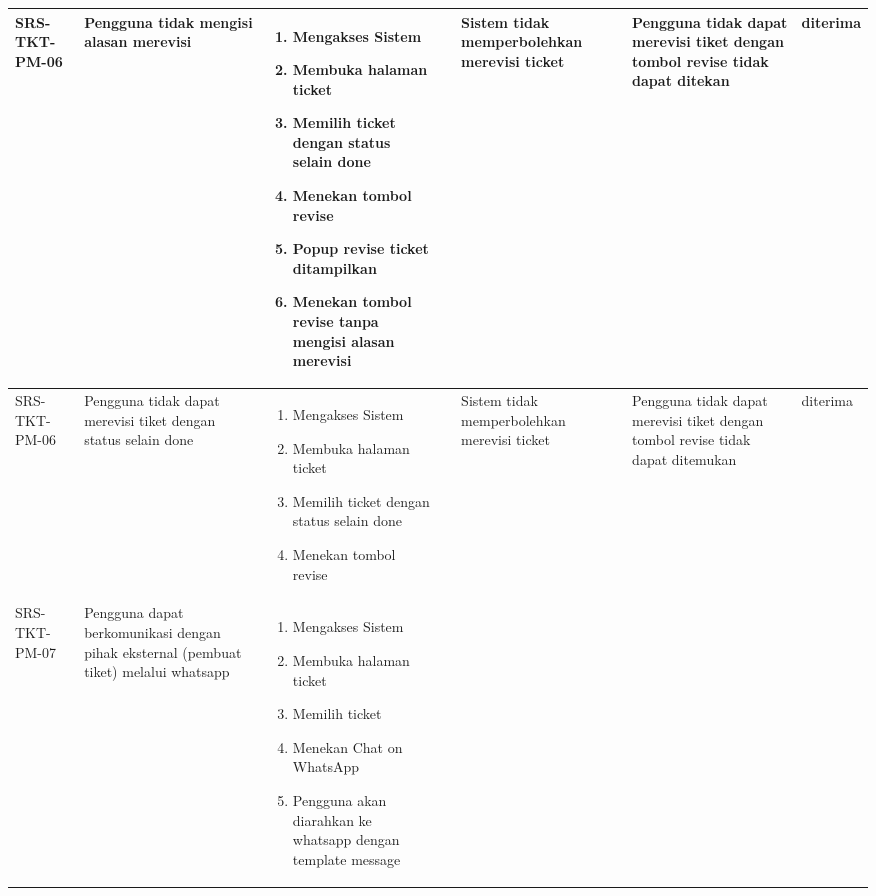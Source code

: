 \documentclass[12pt]{article}
\begin{document}
\begin{enumerate}[label=\textbf{5.\arabic*.}]
\begin{enumerate}[label=\textbf{5.2.\arabic*.}]
\begin{landscape}
\begin{longtable}{ |l|p{}|p{}|p{}|p{}|p{}|l| }
                \hline
                SRS-TKT-PM-06 & Pengguna tidak mengisi alasan merevisi & 
                \begin{enumerate}[label=\arabic*.] 
                    \item Mengakses Sistem
                    \item Membuka halaman ticket
                    \item Memilih ticket dengan status selain done
                    \item Menekan tombol revise
                    \item Popup revise ticket ditampilkan
                    \item Menekan tombol revise tanpa mengisi alasan merevisi
                \end{enumerate} 
                &  & Sistem tidak memperbolehkan merevisi ticket 
                & Pengguna tidak dapat merevisi tiket dengan tombol revise tidak dapat ditekan & diterima \\
                \hline
                SRS-TKT-PM-06 & Pengguna tidak dapat merevisi tiket dengan status selain done & 
                \begin{enumerate}[label=\arabic*.] 
                    \item Mengakses Sistem
                    \item Membuka halaman ticket
                    \item Memilih ticket dengan status selain done
                    \item Menekan tombol revise
                \end{enumerate} 
                &  & Sistem tidak memperbolehkan merevisi ticket 
                & Pengguna tidak dapat merevisi tiket dengan tombol revise tidak dapat ditemukan & diterima \\
                \hline
                SRS-TKT-PM-07 & Pengguna dapat berkomunikasi dengan pihak eksternal (pembuat tiket) melalui whatsapp & 
                \begin{enumerate}[label=\arabic*.] 
                    \item Mengakses Sistem
                    \item Membuka halaman ticket
                    \item Memilih ticket
                    \item Menekan Chat on WhatsApp
                    \item Pengguna akan diarahkan ke whatsapp dengan template message

\end{enumerate}
\end{longtable}
\end{landscape}
\end{enumerate}
\end{enumerate}
\end{document}
